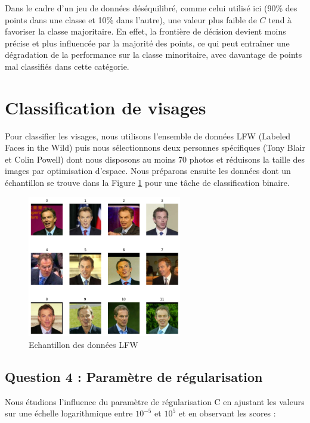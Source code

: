 \documentclass{article}
\begin{document}
\hspace{7pt} Dans le cadre d'un jeu de données déséquilibré, comme celui utilisé ici (90\% des points dans une classe et 10\% dans l'autre), une valeur plus faible de $C$ tend à favoriser la classe majoritaire. En effet, la frontière de décision devient moins précise et plus influencée par la majorité des points, ce qui peut entraîner une dégradation de la performance sur la classe minoritaire, avec davantage de points mal classifiés dans cette catégorie.

\section{Classification de visages}

\hspace{7pt} Pour classifier les visages, nous utilisons l'ensemble de données LFW (Labeled Faces in the Wild) puis nous sélectionnons deux personnes spécifiques (Tony Blair et Colin Powell) dont nous disposons au moins 70 photos et réduisons la taille des images par optimisation d'espace. Nous préparons ensuite les données dont un échantillon se trouve dans la Figure \ref{fig:lfw} pour une tâche de classification binaire.

\begin{figure}[H]
    \centering
    \includegraphics[width=0.6\textwidth]{../images/TB-CP.png}
    \caption{\centering Echantillon des données LFW} 
    \label{fig:lfw}
\end{figure}

\subsection{Question 4 : Paramètre de régularisation}

\hspace{7pt} Nous étudions l'influence du paramètre de régularisation C en ajustant les valeurs sur une échelle logarithmique entre $10^{-5}$ et $10^5$ et en observant les scores :
\end{document}
